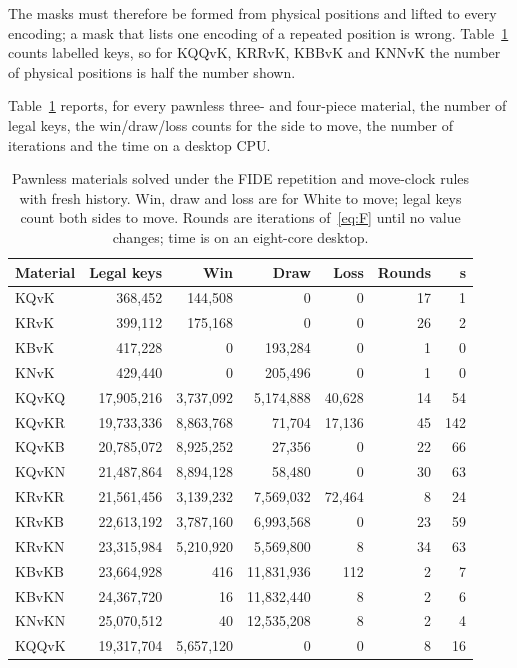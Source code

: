 \documentclass[journal]{IEEEtran}
\theoremstyle{definition}
\theoremstyle{remark}
\begin{document}
The masks must therefore be formed from physical positions and lifted to every encoding; a mask that lists one encoding of a repeated position is wrong. Table~\ref{tab:chess} counts labelled keys, so for KQQvK, KRRvK, KBBvK and KNNvK the number of physical positions is half the number shown.

Table~\ref{tab:chess} reports, for every pawnless three- and four-piece material, the number of legal keys, the win/draw/loss counts for the side to move, the number of iterations and the time on a desktop CPU.

\begin{table}[t]\centering\small
\caption{Pawnless materials solved under the FIDE repetition and move-clock rules with fresh history. Win, draw and loss are for White to move; legal keys count both sides to move. Rounds are iterations of~\eqref{eq:F} until no value changes; time is on an eight-core desktop.}
\label{tab:chess}
\begin{tabular}{@{}lrrrrrr@{}}\toprule
Material & Legal keys & Win & Draw & Loss & Rounds & s\\ \midrule
KQvK & 368{,}452 & 144{,}508 & 0 & 0 & 17 & 1\\
KRvK & 399{,}112 & 175{,}168 & 0 & 0 & 26 & 2\\
KBvK & 417{,}228 & 0 & 193{,}284 & 0 & 1 & 0\\
KNvK & 429{,}440 & 0 & 205{,}496 & 0 & 1 & 0\\
KQvKQ & 17{,}905{,}216 & 3{,}737{,}092 & 5{,}174{,}888 & 40{,}628 & 14 & 54\\
KQvKR & 19{,}733{,}336 & 8{,}863{,}768 & 71{,}704 & 17{,}136 & 45 & 142\\
KQvKB & 20{,}785{,}072 & 8{,}925{,}252 & 27{,}356 & 0 & 22 & 66\\
KQvKN & 21{,}487{,}864 & 8{,}894{,}128 & 58{,}480 & 0 & 30 & 63\\
KRvKR & 21{,}561{,}456 & 3{,}139{,}232 & 7{,}569{,}032 & 72{,}464 & 8 & 24\\
KRvKB & 22{,}613{,}192 & 3{,}787{,}160 & 6{,}993{,}568 & 0 & 23 & 59\\
KRvKN & 23{,}315{,}984 & 5{,}210{,}920 & 5{,}569{,}800 & 8 & 34 & 63\\
KBvKB & 23{,}664{,}928 & 416 & 11{,}831{,}936 & 112 & 2 & 7\\
KBvKN & 24{,}367{,}720 & 16 & 11{,}832{,}440 & 8 & 2 & 6\\
KNvKN & 25{,}070{,}512 & 40 & 12{,}535{,}208 & 8 & 2 & 4\\
KQQvK & 19{,}317{,}704 & 5{,}657{,}120 & 0 & 0 & 8 & 16\\

\end{tabular}
\end{table}
\end{document}
